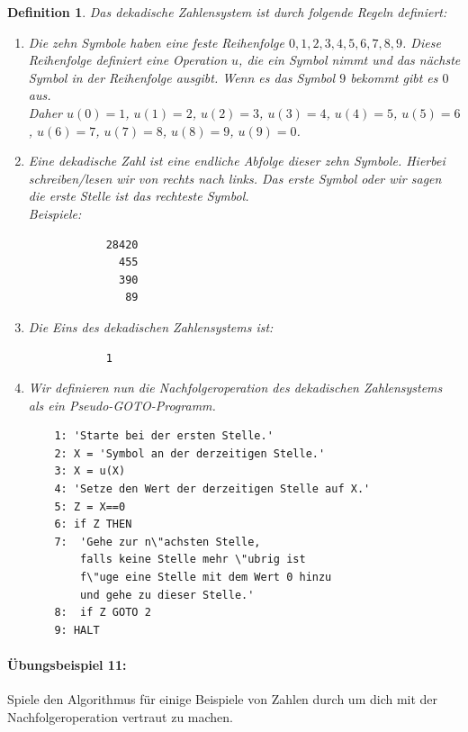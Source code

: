 \documentclass[11pt,a4paper,leqno]{report}
\newtheorem{definition}[theorem]{Definition}
\numberwithin{equation}{chapter}
\begin{document}
\begin{definition}
	Das dekadische Zahlensystem ist durch folgende Regeln definiert:
	\begin{enumerate}
		\item Die zehn Symbole haben eine feste Reihenfolge $0, 1, 2, 3, 4, 5, 6, 7, 8, 9$. Diese Reihenfolge definiert eine Operation $u$, die ein Symbol nimmt und das n\"achste Symbol in der Reihenfolge ausgibt. Wenn es das Symbol $9$ bekommt gibt es $0$ aus.\\ Daher $u(0)=1$, $u(1)=2$, $u(2)=3$, $u(3)=4$, $u(4)=5$, $u(5)=6$, $u(6)=7$, $u(7)=8$, $u(8)=9$, $u(9)=0$.
		\item Eine dekadische Zahl ist eine endliche Abfolge dieser zehn Symbole. Hierbei schreiben/lesen wir von rechts nach links. Das erste Symbol oder wir sagen die erste Stelle ist das rechteste Symbol. \\Beispiele:
		\begin{lstlisting}
			28420
			  455
			  390
			   89
		\end{lstlisting}
		\item Die Eins des dekadischen Zahlensystems ist:
		\begin{lstlisting}
			1
		\end{lstlisting}
		\item Wir definieren nun die Nachfolgeroperation des dekadischen Zahlensystems als ein Pseudo-GOTO-Programm. \\
\begin{lstlisting}
	1: 'Starte bei der ersten Stelle.'
	2: X = 'Symbol an der derzeitigen Stelle.'
	3: X = u(X)
	4: 'Setze den Wert der derzeitigen Stelle auf X.'
	5: Z = X==0
	6: if Z THEN
	7: 	'Gehe zur n\"achsten Stelle, 
		falls keine Stelle mehr \"ubrig ist 
		f\"uge eine Stelle mit dem Wert 0 hinzu
		und gehe zu dieser Stelle.'
	8:	if Z GOTO 2
	9: HALT
\end{lstlisting}
	\end{enumerate}
\end{definition}
\paragraph{\"Ubungsbeispiel 11:} Spiele den Algorithmus f\"ur einige Beispiele von Zahlen durch um dich mit der Nachfolgeroperation vertraut zu machen.
\end{document}
